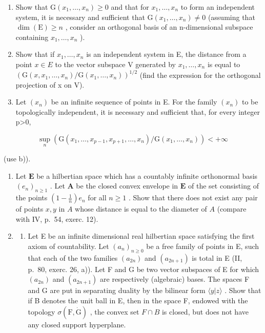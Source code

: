 \begin{enumerate}
\def\labelenumi{\alph{enumi})}
\tightlist
\item
  Show that \(\mathrm{G}(x_{1},\ldots,x_{n})\geqslant0\) and that for \(x_{1},\ldots,x_{n}\) to form an independent system, it is necessary and sufficient that \(\mathrm{G}(x_{1},\ldots,x_{n})\neq0\) (assuming that \(\dim(\mathrm{E})\geqslant n\) , consider an orthogonal basis of an n-dimensional subspace containing \(x_{1},\ldots,x_{n}\) ).
\item
  Show that if \(x_{1},\ldots,x_{n}\) is an independent system in E, the distance from a point \(x\in E\) to the vector subspace V generated by \(x_{1},\ldots,x_{n}\) is equal to \((\mathrm{G}(x,x_{1},\ldots,x_{n})/\mathrm{G}(x_{1},\ldots,x_{n}))^{1/2}\) (find the expression for the orthogonal projection of x on V).
\item
  Let \((x_{n})\) be an infinite sequence of points in E. For the family \((x_{n})\) to be topologically independent, it is necessary and sufficient that, for every integer p\textgreater0,
\end{enumerate}

\[
\sup _ {n} \left(\mathrm{G} \left(x _ {1}, \dots , x _ {p - 1}, x _ {p + 1}, \dots , x _ {n}\right) / \mathrm{G} \left(x _ {1}, \dots , x _ {n}\right)\right) <   + \infty
\]

(use b)).

\begin{enumerate}
\def\labelenumi{\arabic{enumi})}
\setcounter{enumi}{7}
\item
  Let \(\mathbf{E}\) be a hilbertian space which has a countably infinite orthonormal basis \((e_n)_{n\geq 1}\) . Let \(\mathbf{A}\) be the closed convex envelope in \(\mathbf{E}\) of the set consisting of the points \(\left(1 - \frac{1}{n}\right)e_n\) for all \(n \geqslant 1\) . Show that there does not exist any pair of points \(x, y\) in \(A\) whose distance is equal to the diameter of \(A\) (compare with IV, p.~54, exerc. 12).
\item
  \begin{enumerate}
  \def\labelenumii{\alph{enumii})}
  \tightlist
  \item
    Let E be an infinite dimensional real hilbertian space satisfying the first axiom of countability. Let \((a_{n})_{n\geqslant0}\) be a free family of points in E, such that each of the two families \((a_{2n})\) and \((a_{2n+1})\) is total in E (II, p.~80, exerc. 26, a)). Let F and G be two vector subspaces of E for which \((a_{2n})\) and \((a_{2n+1})\) are respectively (algebraic) bases. The spaces F and G are put in separating duality by the bilinear form \(\langle y|z\rangle\) . Show that if B denotes the unit ball in E, then in the space F, endowed with the topology \(\sigma(\mathrm{F},\dot{\mathrm{G}})\) , the convex set \(F\cap B\) is closed, but does not have any closed support hyperplane.
  \end{enumerate}
\end{enumerate}

